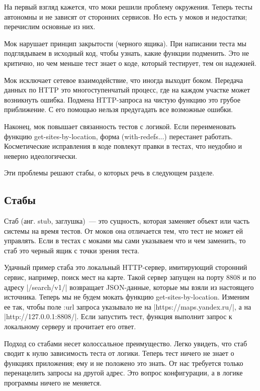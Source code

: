 На первый взгляд кажется, что моки решили проблему окружения. Теперь тесты
автономны и не зависят от сторонних сервисов. Но есть у моков и недостатки;
перечислим основные из них.

Мок нарушает принцип закрытости (черного ящика). При написании теста мы
подглядываем в исходный код, чтобы узнать, какие функции подменить. Это не
критично, но чем меньше тест знает о коде, который тестирует, тем он надежней.

Мок исключает сетевое взаимодействие, что иногда выходит боком. Передача данных
по HTTP это многоступенчатый процесс, где на каждом участке может возникнуть
ошибка. Подмена HTTP-запроса на чистую функцию это грубое приближение. С его
помощью нельзя предугадать все возможные ошибки.

Наконец, мок повышает связанность тестов с логикой. Если переименовать функцию
get-sites-by-location, форма (with-redefs...) перестанет работать. Косметические
исправления в коде повлекут правки в тестах, что неудобно и неверно
идеологически.

Эти проблемы решают стабы, о которых речь в следующем разделе.

\subsection{Стабы}

Стаб (анг. stub, заглушка)~--- это сущность, которая заменяет объект или часть
системы на время тестов. От моков она отличается тем, что тест не может ей
управлять. Если в тестах с моками мы сами указываем что и чем заменить, то стаб
это черный ящик с точки зрения теста.

Удачный пример стаба это локальный HTTP-сервер, имитирующий сторонний сервис,
например, поиск мест на карте. Такой сервер запущен на порту 8808 и по адресу
\spverb|/search/v1/| возвращает JSON-данные, которые мы взяли из настоящего
источника. Теперь мы не будем мокать функцию get-sites-by-location. Изменим ее
так, чтобы поле :url запроса указывало не на \spverb|https://maps.yandex.ru/|, а на
\spverb|http://127.0.0.1:8808/|. Если запустить тест, функция выполнит запрос к
локальному серверу и прочитает его ответ.

Подход со стабами несет колоссальное преимущество. Легко увидеть, что стаб
сводит к нулю зависимость теста от логики. Теперь тест ничего не знает о
функциях приложения; ему и не положено это знать. От нас требуется только
перенацелить запросы на другой адрес. Это вопрос конфигурации, а в логике
программы ничего не меняется.

